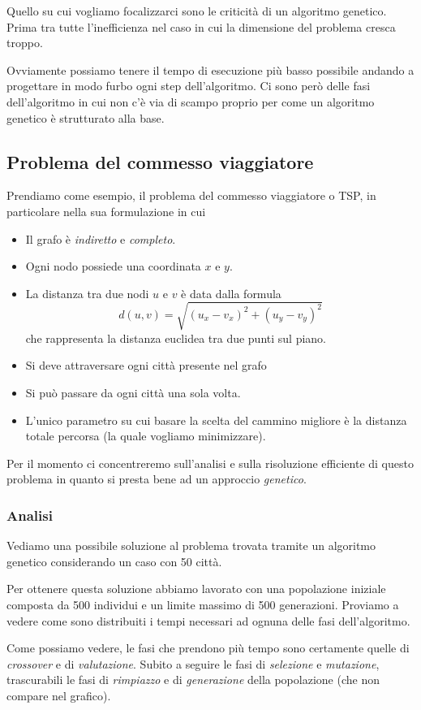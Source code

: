 Quello su cui vogliamo focalizzarci sono le criticità di un algoritmo genetico.
Prima tra tutte l'inefficienza nel caso in cui la dimensione del problema
cresca troppo.

Ovviamente possiamo tenere il tempo di esecuzione più basso possibile andando
a progettare in modo furbo ogni step dell'algoritmo. Ci sono però delle fasi
dell'algoritmo in cui non c'è via di scampo proprio per come un algoritmo
genetico è strutturato alla base.

\subsection{Problema del commesso viaggiatore}

Prendiamo come esempio, il problema del commesso viaggiatore o TSP, in
particolare nella sua formulazione in cui
\begin{itemize}
	\item Il grafo è \emph{indiretto} e \emph{completo}.
	\item Ogni nodo possiede una coordinata $x$ e $y$.
	\item La distanza tra due nodi $u$ e $v$ è data dalla formula
	      \[ d(u, v) = \sqrt{(u_x - v_x)^2 + (u_y - v_y)^2} \]
	      che rappresenta la distanza euclidea tra due punti sul piano.
	\item Si deve attraversare ogni città presente nel grafo
	\item Si può passare da ogni città una sola volta.
	\item L'unico parametro su cui basare la scelta del cammino migliore è
	      la distanza totale percorsa (la quale vogliamo minimizzare).
\end{itemize}
Per il momento ci concentreremo sull'analisi e sulla risoluzione efficiente di
questo problema in quanto si presta bene ad un approccio \emph{genetico}.

\subsubsection{Analisi}

Vediamo una possibile soluzione al problema trovata tramite un algoritmo
genetico considerando un caso con 50 città.
\begin{center}
	
\end{center}
Per ottenere questa soluzione abbiamo lavorato con una popolazione iniziale
composta da 500 individui e un limite massimo di 500 generazioni. Proviamo a
vedere come sono distribuiti i tempi necessari ad ognuna delle fasi
dell'algoritmo.
\begin{center}
	
\end{center}
Come possiamo vedere, le fasi che prendono più tempo sono certamente quelle di
\emph{crossover} e di \emph{valutazione}. Subito a seguire le fasi di
\emph{selezione} e \emph{mutazione}, trascurabili le fasi di \emph{rimpiazzo} e
di \emph{generazione} della popolazione (che non compare nel grafico).

